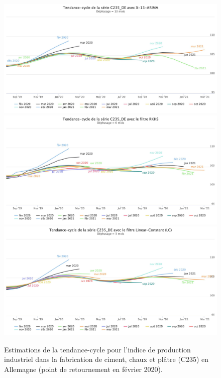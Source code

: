 \documentclass[
  11pt,
  french,
  a4paper]{article}
\newcommand\1{\mathds{1}}
\begin{document}
\begin{figure}[H]

{\centering \includegraphics[width=0.9\linewidth,]{img/simulations/c235_de_x13} \includegraphics[width=0.9\linewidth,]{img/simulations/c235_de_rkhs_timeliness} \includegraphics[width=0.9\linewidth,]{img/simulations/c235_de_lc} 

}

\caption[Estimations de la tendance-cycle pour l'indice de production industriel dans la fabrication de ciment, chaux et plâtre (C235) en Allemagne (point de retournement en février 2020)]{Estimations de la tendance-cycle pour l'indice de production industriel dans la fabrication de ciment, chaux et plâtre (C235) en Allemagne (point de retournement en février 2020).}\label{fig:c235dep1}

\footnotesize
\normalsize\end{figure}
\end{document}

